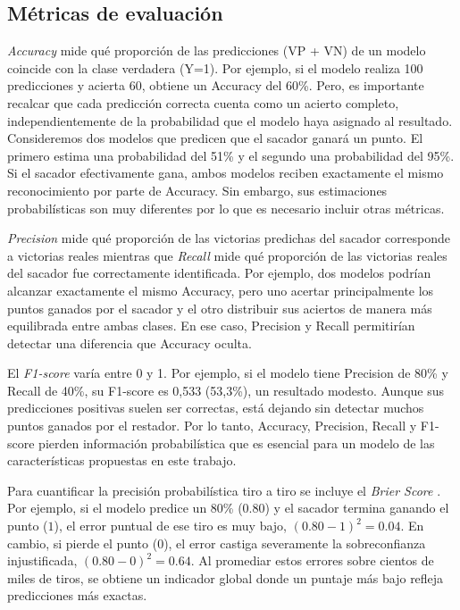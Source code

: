 \documentclass[journal]{IEEEtran}
\begin{document}
\subsection{Métricas de evaluación}
\textit{Accuracy} mide qué proporción de las predicciones (VP + VN) de un modelo coincide con la clase verdadera (Y=1). Por ejemplo, si el modelo realiza 100 predicciones y acierta 60, obtiene un Accuracy del 60\%. Pero, es importante recalcar que cada predicción correcta cuenta como un acierto completo, independientemente de la probabilidad que el modelo haya asignado al resultado. Consideremos dos modelos que predicen que el sacador ganará un punto. El primero estima una probabilidad del 51\% y el segundo una probabilidad del 95\%. Si el sacador efectivamente gana, ambos modelos reciben exactamente el mismo reconocimiento por parte de Accuracy. Sin embargo, sus estimaciones probabilísticas son muy diferentes por lo que es necesario incluir otras métricas. 

\textit{Precision} mide qué proporción de las victorias predichas del sacador corresponde a victorias reales mientras que \textit{Recall} mide qué proporción de las victorias reales del sacador fue correctamente identificada. Por ejemplo, dos modelos podrían alcanzar exactamente el mismo Accuracy, pero uno acertar principalmente los puntos ganados por el sacador y el otro distribuir sus aciertos de manera más equilibrada entre ambas clases.
En ese caso, Precision y Recall permitirían detectar una diferencia que Accuracy oculta.

El \textit{F1-score} varía entre 0 y 1. Por ejemplo, si el modelo tiene Precision de 80\% y Recall de 40\%, su F1-score es 0,533 (53,3\%), un resultado modesto. Aunque sus predicciones positivas suelen ser correctas, está dejando sin detectar muchos puntos ganados por el restador. Por lo tanto, Accuracy, Precision, Recall y F1-score pierden información probabilística que es esencial para un modelo de las características propuestas en este trabajo.

Para cuantificar la precisión probabilística tiro a tiro se incluye el \textit{Brier Score} \cite{brier1950verification}. Por ejemplo, si el modelo predice un 80\% ($0.80$) y el sacador termina ganando el punto ($1$), el error puntual de ese tiro es muy bajo, $(0.80 - 1)^2 = 0.04$. En cambio, si pierde el punto ($0$), el error castiga severamente la sobreconfianza injustificada, $(0.80 - 0)^2 = 0.64$. Al promediar estos errores sobre cientos de miles de tiros, se obtiene un indicador global donde un puntaje más bajo refleja predicciones más exactas.
\end{document}
